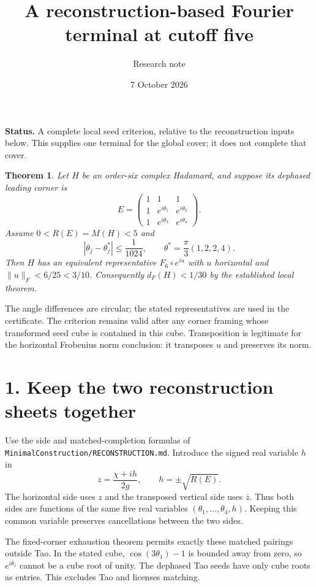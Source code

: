 \documentclass[11pt]{article}
\title{A reconstruction-based Fourier terminal at cutoff five}
\author{Research note}\date{7 October 2026}
\newtheorem{theorem}{Theorem}
\begin{document}
\maketitle
\noindent\textbf{Status.} A complete local seed criterion, relative to
the reconstruction inputs below. This supplies one terminal for the
global cover; it does not complete that cover.

\begin{theorem}\label{thm:main}
Let $H$ be an order-six complex Hadamard, and suppose its dephased
leading corner is
\[
 E=\begin{pmatrix}1&1&1\\1&e^{i\theta_1}&e^{i\theta_2}
                 \\1&e^{i\theta_3}&e^{i\theta_4}\end{pmatrix}.
\]
Assume $0<R(E)=M(H)<5$ and
\[
 \left|\theta_j-\theta_j^*\right|\le\frac1{1024},\qquad
 \theta^*=\frac\pi3(1,2,2,4).
\]
Then $H$ has an equivalent representative $F_6\circ e^{iu}$ with
$u$ horizontal and $\|u\|_F<6/25<3/10$. Consequently
$d_F(H)<1/30$ by the established local theorem.
\end{theorem}

The angle differences are circular; the stated representatives are
used in the certificate. The criterion remains valid after any corner
framing whose transformed seed cube is contained in this cube.
Transposition is legitimate for the horizontal Frobenius norm
conclusion: it transposes $u$ and preserves its norm.

\section*{1. Keep the two reconstruction sheets together}
Use the side and matched-completion formulas of
\texttt{MinimalConstruction/RECONSTRUCTION.md}. Introduce the signed
real variable $h$ in
\[
 z=\frac{\chi+ih}{2g},\qquad h=\pm\sqrt{R(E)}.
\]
The horizontal side uses $z$ and the transposed vertical side uses
$\bar z$. Thus both sides are functions of the same five real
variables $(\theta_1,\ldots,\theta_4,h)$. Keeping this common variable
preserves cancellations between the two sides.

The fixed-corner exhaustion theorem permits exactly these matched
pairings outside Tao. In the stated cube,
$\cos(3\theta_1)-1$ is bounded away from zero, so $e^{i\theta_1}$
cannot be a cube root of unity. The dephased Tao seeds have only cube
roots as entries. This excludes Tao and licenses matching.
\end{document}
